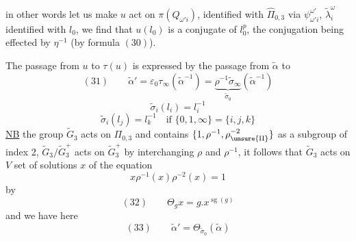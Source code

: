 in other words let us make $u$ act on $\pi(Q_{\omega'i})$, identified with $\widehat\Pi_{0,3}$ via $\psi_{\omega'i}^{\omega'}$, $\widetilde\lambda_i^\omega$ identified with $l_0$, we find that $u(l_0)$ is a conjugate of $l_0^p$,  the conjugation being effected by $\eta^{-1}$ (by formula $(30)$).

The passage from $u$ to $\tau(u)$ is expressed by
the passage from $\widetilde\alpha$ to
\[
(31)\qquad\widetilde\alpha'=\varepsilon_0\tau_\infty(\widetilde\alpha^{-1})
=\underbrace{\rho^{-1}\widetilde\sigma_\infty}_{\widetilde\sigma_0}(\widetilde\alpha^{-1})
\]
\[
\widetilde\sigma_i(l_i)=l_i^{-1}
\]
\[
\widetilde\sigma_i(l_j)=l_k^{-1}\quad\text{if }\{0,1,\infty\}=\{i,j,k\}
\]
\uline{NB} the group $\widetilde G_3$ acts on $\Pi_{0,3}$ and contains \deleted{$\unsure{\xi}$}  $\{1,\rho^{-1},\rho_{\unsure{\mathrm{II}}}^{-2}\}$ as a subgroup  of index 2,  $\widetilde G_3/\widetilde G_3^+$ acts on $\widetilde G_3^+$ by interchanging $\rho$ and $\rho^{-1}$, it follows that $\widetilde G_3$ acts on $V$ set of solutions $x$ of the equation
\[
x\rho^{-1}(x)\rho^{-2}(x)=1
\]
by
\[
(32)\qquad\Theta_g x=g.x^{\operatorname{sg}(g)}
\]
and we have here
\[
(33)\qquad\widetilde\alpha'=\Theta_{\widetilde\sigma_0}(\widetilde\alpha)
\]

